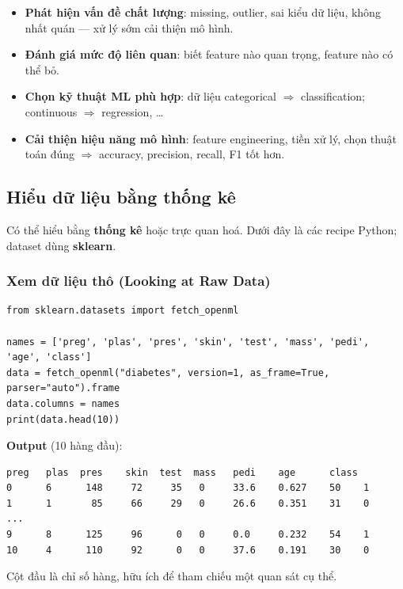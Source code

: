 \begin{ynghia}[title={Bốn lý do chính}]
\begin{itemize}
  \item \textbf{Phát hiện vấn đề chất lượng}: missing, outlier, sai kiểu dữ liệu, không nhất quán --- xử lý sớm cải thiện mô hình.
  \item \textbf{Đánh giá mức độ liên quan}: biết feature nào quan trọng, feature nào có thể bỏ.
  \item \textbf{Chọn kỹ thuật ML phù hợp}: dữ liệu categorical $\Rightarrow$ classification; continuous $\Rightarrow$ regression, \ldots
  \item \textbf{Cải thiện hiệu năng mô hình}: feature engineering, tiền xử lý, chọn thuật toán đúng $\Rightarrow$ accuracy, precision, recall, F1 tốt hơn.
\end{itemize}
\end{ynghia}

\subsection{Hiểu dữ liệu bằng thống kê}

\begin{ynghia}[title={Hai hướng: thống kê và trực quan hoá}]
Có thể hiểu bằng \textbf{thống kê} hoặc trực quan hoá. Dưới đây là các recipe Python; dataset dùng \textbf{sklearn}.
\end{ynghia}

\subsubsection{Xem dữ liệu thô (Looking at Raw Data)}

\begin{vidu}[title={head() trên dataset Pima Indians Diabetes}]
\begin{lstlisting}
from sklearn.datasets import fetch_openml

names = ['preg', 'plas', 'pres', 'skin', 'test', 'mass', 'pedi', 'age', 'class']
data = fetch_openml("diabetes", version=1, as_frame=True, parser="auto").frame
data.columns = names
print(data.head(10))
\end{lstlisting}

\textbf{Output} (10 hàng đầu):
\begin{lstlisting}
preg   plas  pres    skin  test  mass   pedi    age      class
0      6      148     72     35   0     33.6    0.627    50    1
1      1       85     66     29   0     26.6    0.351    31    0
...
9      8      125     96      0   0     0.0     0.232    54    1
10     4      110     92      0   0     37.6    0.191    30    0
\end{lstlisting}
Cột đầu là chỉ số hàng, hữu ích để tham chiếu một quan sát cụ thể.
\end{vidu}

